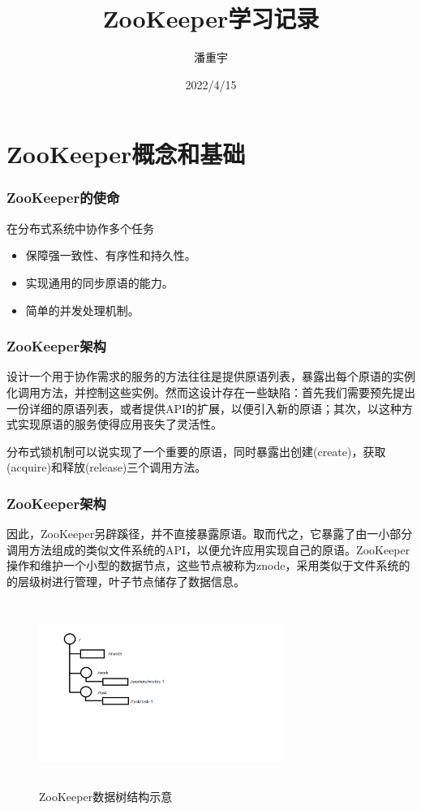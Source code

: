 \documentclass{beamer}
\title{ZooKeeper学习记录}
\author{潘重宇}
\institute{兴业数金}
\date{2022/4/15}
\begin{document}
	
\frame{\titlepage}


\section{ZooKeeper概念和基础}
\begin{frame}
	\frametitle{ZooKeeper的使命}
	在分布式系统中协作多个任务
\begin{itemize}
	\item<1-> 保障强一致性、有序性和持久性。
	\item<2-> 实现通用的同步原语的能力。
	\item<3-> 简单的并发处理机制。
\end{itemize}
\end{frame}

\begin{frame}
	\frametitle{ZooKeeper架构}
	设计一个用于协作需求的服务的方法往往是提供原语列表，暴露出每个原语的实例化调用方法，并控制这些实例。然而这设计存在一些缺陷：首先我们需要预先提出一份详细的原语列表，或者提供API的扩展，以便引入新的原语；其次，以这种方式实现原语的服务使得应用丧失了灵活性。

\begin{examples}
	分布式锁机制可以说实现了一个重要的原语，同时暴露出创建(create)，获取(acquire)和释放(release)三个调用方法。
\end{examples}
\end{frame}

\begin{frame}
	\frametitle{ZooKeeper架构}
	因此，ZooKeeper另辟蹊径，并不直接暴露原语。取而代之，它暴露了由一小部分调用方法组成的类似文件系统的API，以便允许应用实现自己的原语。ZooKeeper操作和维护一个小型的数据节点，这些节点被称为znode，采用类似于文件系统的的层级树进行管理，叶子节点储存了数据信息。
	\begin{figure}[b]
		\caption{ZooKeeper数据树结构示意}
		\includegraphics[width=8cm, height=6cm]{zookeper架构.png}
	\end{figure}
\end{frame}
\end{document}
